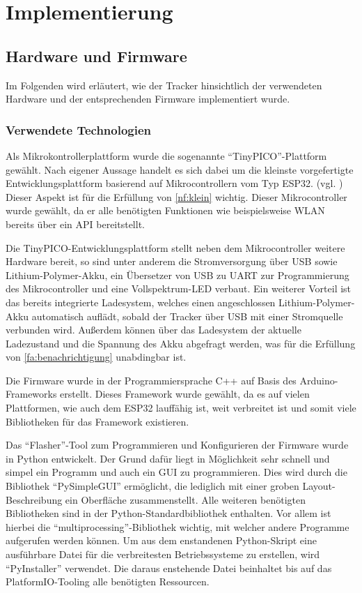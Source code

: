 \chapter{Implementierung} \label{chap:implementierung}

\section{Hardware und Firmware}

Im Folgenden wird erläutert, wie der Tracker hinsichtlich der verwendeten Hardware und der
entsprechenden Firmware implementiert wurde.

\subsection{Verwendete Technologien}\label{sec:hardware-used-technologies}

Als Mikrokontrollerplattform wurde die sogenannte \enquote{TinyPICO}-Plattform gewählt. Nach eigener
Aussage handelt es sich dabei um die kleinste vorgefertigte Entwicklungsplattform basierend auf
Mikrocontrollern vom Typ ESP32. (vgl. \cite{tinypico2020}) Dieser Aspekt ist für die Erfüllung von \ref{nf:klein} wichtig.
Dieser Mikrocontroller wurde gewählt, da er alle benötigten Funktionen wie beispielsweise \gls{WLAN}
bereits über ein \gls{API} bereitstellt.

Die TinyPICO-Entwicklungsplattform stellt neben dem Mikrocontroller weitere Hardware bereit, so sind
unter anderem
die Stromversorgung über \gls{USB} sowie Lithium-Polymer-\gls{Akku}, ein Übersetzer von \gls{USB}
zu \gls{UART} zur Programmierung des Mikrocontroller und eine Vollspektrum-\gls{LED} verbaut.
Ein weiterer Vorteil ist das bereits integrierte Ladesystem, welches einen angeschlossen
Lithium-Polymer-\gls{Akku} automatisch auflädt, sobald der Tracker über \gls{USB} mit einer
Stromquelle verbunden wird. Außerdem können über das Ladesystem der aktuelle Ladezustand und die
Spannung des \gls{Akku} abgefragt werden, was für die Erfüllung von \ref{fa:benachrichtigung}
unabdingbar ist.

Die Firmware wurde in der Programmiersprache C++ auf Basis des Arduino-Frameworks erstellt. Dieses
Framework wurde gewählt, da es auf vielen Plattformen, wie auch dem ESP32 lauffähig ist, weit
verbreitet ist und somit viele Bibliotheken für das Framework existieren.

Das \enquote{Flasher}-Tool zum Programmieren und Konfigurieren der Firmware wurde in Python
entwickelt.
Der Grund dafür liegt in Möglichkeit sehr schnell und simpel ein Programm und auch ein \gls{GUI} zu
programmieren.
Dies wird durch die Bibliothek \enquote{PySimpleGUI} ermöglicht, die lediglich mit einer groben Layout-Beschreibung
ein Oberfläche zusammenstellt.
Alle weiteren benötigten Bibliotheken sind in der Python-Standardbibliothek enthalten.
Vor allem ist hierbei die \enquote{multiprocessing}-Bibliothek wichtig, mit welcher andere Programme aufgerufen werden können.
Um aus dem enstandenen Python-Skript eine ausführbare Datei für die verbreitesten Betriebssysteme zu erstellen, wird \enquote{PyInstaller} verwendet.
Die daraus enstehende Datei beinhaltet bis auf das PlatformIO-Tooling alle benötigten Ressourcen.

